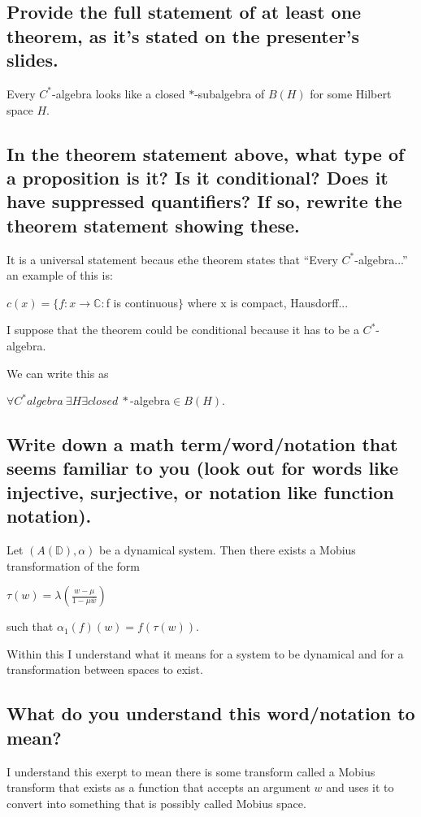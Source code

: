 
\subsection{Provide the full statement of at least one theorem, as it’s stated on the presenter’s slides.}
Every $C^*$-algebra looks like a closed $*$-subalgebra of $B(H)$ for some Hilbert space $H$.

\subsection{In the theorem statement above, what type of a proposition is it? Is it conditional? Does it have suppressed quantifiers? If so, rewrite the theorem statement showing these.}
It is a universal statement becaus ethe theorem states that ``Every $C^*$-algebra...'' an example of this is:

\begin{center}
  $c(x) = \{f : x \rightarrow \mathbb{C} : $f is continuous$\}$ where x is compact, Hausdorff...
\end{center}

I suppose that the theorem could be conditional because it has to be a $C^*$-algebra.

We can write this as
\begin{center}
  $\forall C^* algebra~\exists H \exists closed~*$-algebra$\in B(H)$.
\end{center}

\subsection{Write down a math term/word/notation that seems familiar to you (look out for words like injective, surjective, or notation like function notation).}
Let $(A(\mathbb{D}), \alpha)$ be a dynamical system. Then there exists a Mobius transformation of the form

\begin{center}
  $\tau(w) = \lambda (\frac{w-\mu}{1-\mu\bar w})$
\end{center}
such that $\alpha_1(f)(w) = f(\tau(w))$.

Within this I understand what it means for a system to be dynamical and for a transformation between spaces to exist.

\subsection{What do you understand this word/notation to mean?}
I understand this exerpt to mean there is some transform called a Mobius transform that exists as a function that accepts an argument $w$ and uses it to convert into something that is possibly called Mobius space.

